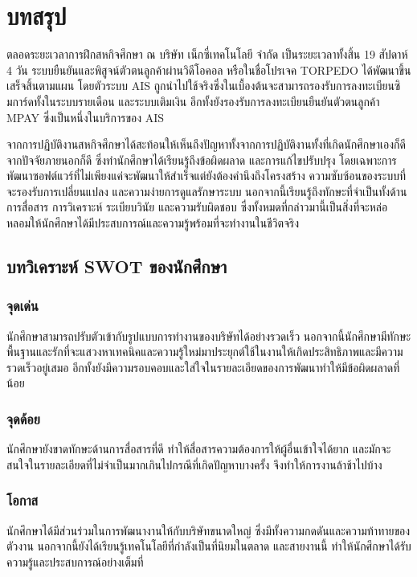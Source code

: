 \chapter{บทสรุป}
\label{chapter:conclusion}
ตลอดระยะเวลาการฝึกสหกิจศึกษา ณ บริษัท เน็กซี่เทคโนโลยี จำกัด เป็นระยะเวลาทั้งสิ้น 19 สัปดาห์ 4 วัน ระบบยืนยันและพิสูจน์ตัวตนลูกค้าผ่านวิดีโอคอล หรือในชื่อโปรเจค TORPEDO ได้พัฒนาขึ้นเสร็จสิ้นตามแผน โดยตัวระบบ AIS ถูกนำไปใช้จริงซึ่งในเบื้องต้นจะสามารถรองรับการลงทะเบียนซิมการ์ดทั้งในระบบรายเดือน และระบบเติมเงิน อีกทั้งยังรองรับการลงทะเบียนยืนยันตัวตนลูกค้า MPAY ซึ่งเป็นหนึ่งในบริการของ AIS

จากการปฏิบัติงานสหกิจศึกษาได้สะท้อนให้เห็นถึงปัญหาทั้งจากการปฏิบัติงานทั้งที่เกิดนักศึกษาเองก็ดี จากปัจจัยภายนอกก็ดี ซึ่งทำนักศึกษาได้เรียนรู้ถึงข้อผิดผลาด และการแก้ไขปรับปรุง โดยเฉพาะการพัฒนาซอฟต์แวร์ที่ไม่เพียงแค่จะพัฒนาให้สำเร็จแต่ยังต้องคำนึงถึงโครงสร้าง ความซับซ้อนของระบบที่จะรองรับการเปลี่ยนแปลง และความง่ายการดูแลรักษาระบบ นอกจากนี้เรียนรู้ถึงทักษะที่จำเป็นทั้งด้านการสื่อสาร การวิเคราะห์ ระเบียบวินัย และความรับผิดชอบ ซึ่งทั้งหมดที่กล่าวมานี้เป็นสิ่งที่จะหล่อหลอมให้นักศึกษาได้มีประสบการณ์และความรู้พร้อมที่จะทำงานในชีวิตจริง
\section{บทวิเคราะห์ SWOT ของนักศึกษา}

\subsection{จุดเด่น}
นักศึกษาสามารถปรับตัวเข้ากับรูปแบบการทำงานของบริษัทได้อย่างรวดเร็ว นอกจากนี้นักศึกษามีทักษะพื้นฐานและรักที่จะแสวงหาเทคนิคและความรู้ใหม่มาประยุกต์ใช้ในงานให้เกิดประสิทธิภาพและมีความรวดเร็วอยู่เสมอ อีกทั้งยังมีความรอบคอบและใส่ใจในรายละเอียดของการพัฒนาทำให้มีข้อผิดผลาดที่น้อย
\subsection{จุดด้อย}
นักศึกษายังขาดทักษะด้านการสื่อสารที่ดี ทำให้สื่อสารความต้องการให้ผู้อื่นเข้าใจได้ยาก และมักจะสนใจในรายละเอียดที่ไม่จำเป็นมากเกินไปกรณีที่เกิดปัญหาบางครั้ง จึงทำให้การงานล้าช้าไปบ้าง
\subsection{โอกาส}
นักศึกษาได้มีส่วนร่วมในการพัฒนางานให้กับบริษัทขนาดใหญ่ ซึ่งมีทั้งความกดดันและความท้าทายของตัวงาน  นอกจากนี้ยังได้เรียนรู้เทคโนโลยีที่กำลังเป็นที่นิยมในตลาด และสายงานนี้ ทำให้นักศึกษาได้รับความรู้และประสบการณ์อย่างเต็มที่
